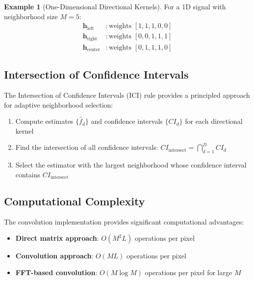 \documentclass[12pt]{article}
\renewcommand{\vec}[1]{\mathbf{#1}}
\theoremstyle{definition}
\newtheorem{example}[theorem]{Example}
\begin{document}
\begin{example}[One-Dimensional Directional Kernels]
    \label{ex:1d_directional}
    For a 1D signal with neighborhood size $M = 5$:
    \begin{align}
        \vec{h}_{\text{left}}   & : \text{weights } [1, 1, 1, 0, 0] \\
        \vec{h}_{\text{right}}  & : \text{weights } [0, 0, 1, 1, 1] \\
        \vec{h}_{\text{center}} & : \text{weights } [0, 1, 1, 1, 0]
    \end{align}
\end{example}

\subsection{Intersection of Confidence Intervals}
\label{subsec:ici}

The Intersection of Confidence Intervals (ICI) rule provides a principled approach for adaptive neighborhood selection:

\begin{algorithm}
    \label{alg:ici}
    \begin{enumerate}
        \item Compute estimates $\{\hat{f}_d\}$ and confidence intervals $\{CI_d\}$ for each directional kernel
        \item Find the intersection of all confidence intervals: $CI_{\text{intersect}} = \bigcap_{d=1}^{D} CI_d$
        \item Select the estimator with the largest neighborhood whose confidence interval contains $CI_{\text{intersect}}$
    \end{enumerate}
\end{algorithm}

\subsection{Computational Complexity}
\label{subsec:complexity}

The convolution implementation provides significant computational advantages:

\begin{itemize}
    \item \textbf{Direct matrix approach}: $O(M^2 L)$ operations per pixel
    \item \textbf{Convolution approach}: $O(ML)$ operations per pixel
    \item \textbf{FFT-based convolution}: $O(M \log M)$ operations per pixel for large $M$
\end{itemize}
\end{document}
